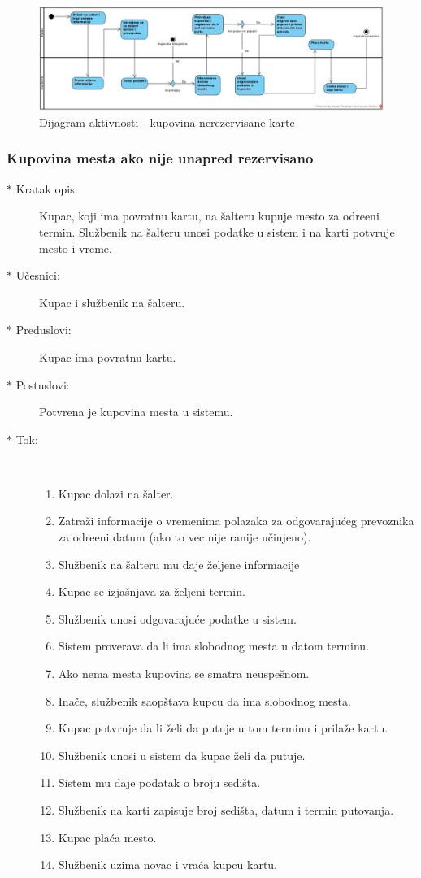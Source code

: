 \begin{figure}[!htb] 
	\centering
	\includegraphics[width=1.2\linewidth]{"../Slike/kupovina"}
	\caption{Dijagram aktivnosti - kupovina nerezervisane karte}
	\label{fig:kupovina}
\end{figure}

\subsubsection{Kupovina mesta ako nije unapred rezervisano}
\begin{description}
	\item[$\ast$ Kratak opis: ] Kupac, koji ima povratnu kartu, na \v salteru kupuje mesto za odre\dj{}eni termin. Slu\v zbenik na \v salteru unosi podatke u sistem i na karti potvr\dj{}uje mesto i vreme.
	\item[$\ast$ U\v cesnici: ] Kupac i slu\v zbenik na \v salteru.
	\item[$\ast$ Preduslovi: ] Kupac ima povratnu kartu.
	\item[$\ast$ Postuslovi: ] Potvr\dj{}ena je kupovina mesta u sistemu.
	\item[$\ast$ Tok: ] \ \\
	\begin{enumerate}
		\item Kupac dolazi na \v salter.
		\item Zatra\v zi informacije o vremenima polazaka za odgovaraju\'ceg prevoznika za odre\dj{}eni datum (ako to vec nije ranije u\v cinjeno).
		\item Slu\v zbenik na \v salteru mu daje \v zeljene informacije
		\item Kupac se izja\v snjava za \v zeljeni termin.
		\item Slu\v zbenik unosi odgovaraju\'ce podatke u sistem.
		\item Sistem proverava da li ima slobodnog mesta u datom terminu.
		\item Ako nema mesta kupovina se smatra neuspe\v snom.
		\item Ina\v ce, slu\v zbenik saop\v stava kupcu da ima slobodnog mesta.
		\item Kupac potvr\dj{}uje da li \v zeli da putuje u tom terminu i prila\v ze kartu.
		\item Slu\v zbenik unosi u sistem da kupac \v zeli da putuje.
		\item Sistem mu daje podatak o broju sedi\v sta.
		\item Slu\v zbenik na karti zapisuje broj sedi\v sta, datum i termin putovanja.
		\item Kupac pla\'ca mesto.
		\item Slu\v zbenik uzima novac i vra\'ca kupcu kartu.
	\end{enumerate}
\end{description}

